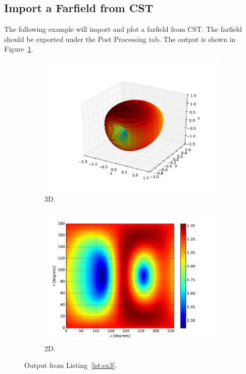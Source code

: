 \subsection{Import a Farfield from CST}
The following example will import and plot a farfield from CST. The farfield should be exported under the Post Processing tab. The output is shown in Figure~\ref{fig:pp_example3}.




\begin{figure}[htbp]
    \centering
    \begin{subfigure}{0.49\linewidth}
        \centering
        \includegraphics[scale=0.5]{sec/post_processing/examples/ex3_3dfarfield.pdf}
        \caption{3D.}
    \end{subfigure}
    \hfill
    \begin{subfigure}{0.49\linewidth}
        \centering
        \includegraphics[scale=0.5]{sec/post_processing/examples/ex3_2dfarfield.pdf}
        \caption{2D.}
    \end{subfigure}
    \caption{Output from Listing~\ref{lst:ex3}.}
    \label{fig:pp_example3}
\end{figure}

